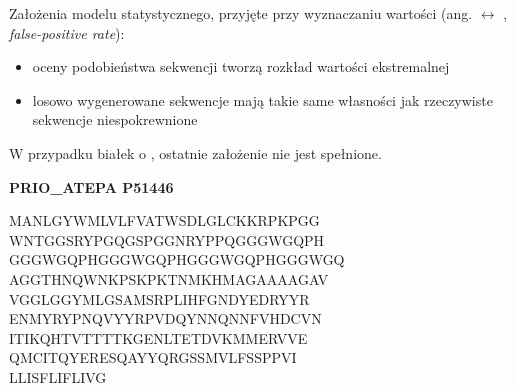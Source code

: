 \begin{frame}
\vspace*{2ex}\noindent\begin{minipage}[t]{.54\textwidth}\vspace{0pt}
\raggedright\tiny Założenia modelu statystycznego, przyjęte
przy wyznaczaniu wartości  (ang. 
$\leftrightarrow$ ,
\emph{false-positive rate}):
\begin{itemize}
\item oceny podobieństwa sekwencji tworzą rozkład wartości ekstremalnej
\item losowo wygenerowane sekwencje mają takie same własności jak
rzeczywiste sekwencje niespokrewnione 
\end{itemize}
W przypadku białek o , ostatnie
założenie nie jest spełnione.
\end{minipage}\hspace{.01\textwidth}%
\begin{minipage}[t]{.45\textwidth}\vspace{0pt}\tiny
{\bfseries\ttfamily\color{bluish}PRIO\_ATEPA P51446}\\[-1ex]
\begin{flushleft}\ttfamily
MANLGYWMLVLFVATWSDLGLCKKRPKPGG\\
WNTGGSRYPGQGSPGGNRY{\color{gold}PPQGGGWGQPH\\
GGGWGQPHGGGWGQPHGGGWGQPHGGGWGQ
AGG}THNQWNKPSKPKTNMKHM{\color{gold}AGAAAAGAV\\
VGGLGGYMLGSAMS}RPLIHFGNDYEDRYYR\\
ENMYRYPNQVYYRPVDQYNNQNNFVHDCVN\\
ITIKQH{\color{gold}TVTTTTKGENLTET}DVKMMERVVE\\
QMCITQYERESQAYYQRGSSMVLFS{\color{gold}SPPVI\\
LLISFLIFLIVG}
\end{flushleft}
\end{minipage}
\end{frame}

